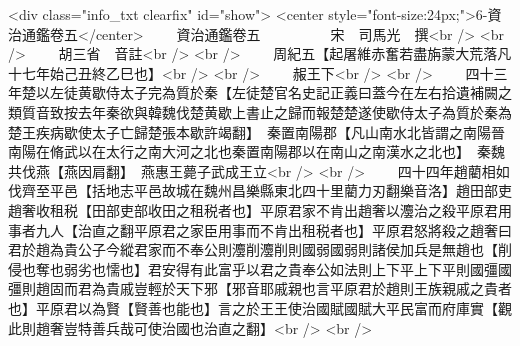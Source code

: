 <div class="info_txt clearfix" id="show">
<center style="font-size:24px;">6-資治通鑑卷五</center>
  　　資治通鑑卷五　　　　　宋　司馬光　撰<br />
<br />
　　胡三省　音註<br />
<br />
　　周紀五【起屠維赤奮若盡旃蒙大荒落凡十七年始己丑終乙巳也】<br />
<br />
　　赧王下<br />
<br />
　　四十三年楚以左徒黄歇侍太子完為質於秦【左徒楚官名史記正義曰蓋今在左右拾遺補闕之類質音致按去年秦欲與韓魏伐楚黄歇上書止之歸而報楚楚遂使歇侍太子為質於秦為楚王疾病歇使太子亡歸楚張本歇許竭翻】　秦置南陽郡【凡山南水北皆謂之南陽晉南陽在脩武以在太行之南大河之北也秦置南陽郡以在南山之南漢水之北也】　秦魏共伐燕【燕因肩翻】　燕惠王薨子武成王立<br />
<br />
　　四十四年趙藺相如伐齊至平邑【括地志平邑故城在魏州昌樂縣東北四十里藺力刃翻樂音洛】趙田部吏趙奢收租税【田部吏部收田之租税者也】平原君家不肯出趙奢以灋治之殺平原君用事者九人【治直之翻平原君之家臣用事而不肯出租税者也】平原君怒將殺之趙奢曰君於趙為貴公子今縱君家而不奉公則灋削灋削則國弱國弱則諸侯加兵是無趙也【削侵也奪也弱劣也懦也】君安得有此富乎以君之貴奉公如法則上下平上下平則國彊國彊則趙固而君為貴戚豈輕於天下邪【邪音耶戚親也言平原君於趙則王族親戚之貴者也】平原君以為賢【賢善也能也】言之於王王使治國賦國賦大平民富而府庫實【觀此則趙奢豈特善兵哉可使治國也治直之翻】<br />
<br />
